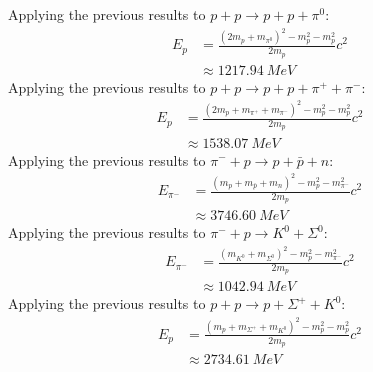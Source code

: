 \documentclass{article}
\begin{document}
Applying the previous results to $p + p \to p + p + \pi^0$:
\begin{equation}
    \begin{split}
        E_p & = \frac{\left(2m_p + m_{\pi^0}\right)^2 - m_p^2 - m_p^2}{2m_p}c^2 \\
        & \approx 1217.94~\unit{MeV}
    \end{split}
\end{equation}
Applying the previous results to $p + p \to p + p + \pi^+ + \pi^-$:
\begin{equation}
    \begin{split}
        E_p & = \frac{\left(2m_p + m_{\pi^+} + m_{\pi^-}\right)^2 - m_p^2 - m_p^2}{2m_p}c^2 \\
        & \approx 1538.07~\unit{MeV}
    \end{split}
\end{equation}
Applying the previous results to $\pi^- + p \to p + \bar{p} + n$:
\begin{equation}
    \begin{split}
        E_{\pi^-} & = \frac{\left(m_p + m_{\bar{p}} + m_{n}\right)^2 - m_p^2 - m_{\pi^{-}}^2}{2m_p}c^2 \\
        & \approx 3746.60~\unit{MeV}
    \end{split}
\end{equation}
Applying the previous results to $\pi^- + p \to K^0 + \Sigma^0$:
\begin{equation}
    \begin{split}
        E_{\pi^-} & = \frac{\left(m_{K^0} + m_{\Sigma^0}\right)^2 - m_p^2 - m_{\pi^{-}}^2}{2m_p}c^2 \\
        & \approx 1042.94~\unit{MeV}
    \end{split}
\end{equation}
Applying the previous results to $p + p \to p + \Sigma^+ + K^0$:
\begin{equation}
    \begin{split}
        E_p & = \frac{\left(m_p + m_{\Sigma^+} + m_{K^0}\right)^2 - m_p^2 - m_p^2}{2m_p}c^2 \\
        & \approx 2734.61~\unit{MeV}
    \end{split}
\end{equation}
\clearpage
\end{document}
